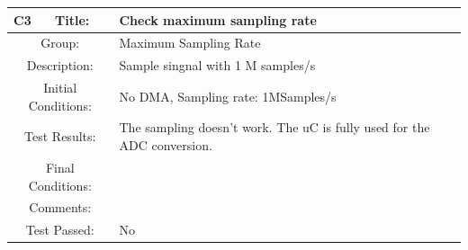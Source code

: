 \documentclass[12pt]{article}
\begin{document}
		\begin{table}[H]
	\begin{center}
		\begin{tabular}{| m{2cm}|m{2cm}|m{12cm}|}
			\hline 
			\bf C3&\bf Title:&\bf Check maximum sampling rate\\ 
			\hline 
			\multicolumn{2}{|c|}{Group:}&Maximum Sampling Rate\\ 
			\hline 
			\multicolumn{2}{|c|}{Description:}&Sample singnal with 1 M samples/s\\ 
			\hline 
			\multicolumn{2}{|c|}{Initial Conditions:}&No DMA, Sampling rate: 1MSamples/s\\ 
			\hline 
			\multicolumn{2}{|c|}{Test Results:}&The sampling doesn't work. The uC is fully used for the ADC conversion.\\ 
			\hline 
			\multicolumn{2}{|c|}{Final Conditions:}&\\ 
			\hline 
			\multicolumn{2}{|c|}{Comments:}&\\ 
			\hline 
			\multicolumn{2}{|c|}{Test Passed:}&No \\ 
			\hline 
		\end{tabular} 
	\end{center}
\end{table}	
\end{document}
